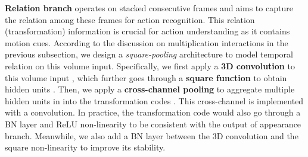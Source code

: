 \documentclass[10pt,twocolumn,letterpaper]{article}
\begin{document}
{\bf Relation branch} operates on stacked consecutive frames and aims to capture the relation among these frames for action recognition. This relation (transformation) information is crucial for action understanding as it contains motion cues. According to the discussion on multiplication interactions in the previous subsection, we design a {\em square-pooling} architecture to model temporal relation on this volume input. Specifically, we first apply a {\bf 3D convolution} to this volume input , which further goes through a {\bf square function} to obtain hidden units . Then, we apply a {\bf cross-channel pooling}  to aggregate multiple hidden units in  into the transformation codes . This cross-channel is implemented with a  convolution. In practice, the transformation code  would also go through a BN layer and ReLU non-linearity to be consistent with the output of appearance branch. Meanwhile, we also add a BN layer between the 3D convolution and the square non-linearity to improve its stability.

\begin{table*}
\centering
{}
\vspace{1mm}
\caption{{\bf Architectures for the Kinetics dataset}: we study three different networks for spatiotemporal feature learning by stacking two types of building blocks from Figure~\ref{fig:smart}: (1) 3D convolutions and (2) SMART blocks. Building blocks are shown in brackets, with the numbers of stacked blocks. The input to these networks is volume of  and downsample is performed conv3\_1, conv4\_1, and conv5\_1 with a stride of . }
\label{tbl:artnet-resnet18}
\vspace{-3mm}
\end{table*}
\end{document}
